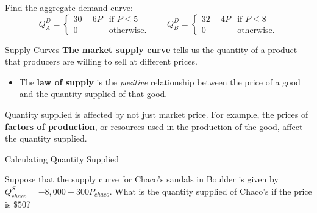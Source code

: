 \documentclass[12pt,t]{beamer}
\begin{document}
\begin{frame}

  \bigskip
  Find the aggregate demand curve:
  $$
    Q_A^D =
    \begin{cases}
      30 - 6P & \text{if } P \leq 5 \\
      0       & \text{otherwise}.
    \end{cases}
    \quad\quad
    Q_B^D =
    \begin{cases}
      32 - 4P & \text{if } P  \leq 8 \\
      0       & \text{otherwise}.
    \end{cases}
  $$
\end{frame}

\begin{frame}{Supply Curves}
  \textbf{The market supply curve} tells us the quantity of a product that producers are willing to sell at different prices.

  \begin{itemize}
    \item The \textbf{law of supply} is the \emph{positive} relationship between the price of a good and the quantity supplied of that good.
  \end{itemize}

  \pause
  \bigskip
  Quantity supplied is affected by not just market price. For example, the prices of \textbf{factors of production}, or resources used in the production of the good, affect the quantity supplied.
\end{frame}

\begin{frame}{Calculating Quantity Supplied}

\bigskip
Suppose that the supply curve for Chaco's sandals in Boulder is given by $Q^S_{chaco} = -8,000 + 300P_{chaco}$. What is the quantity supplied of Chaco's if the price is $ \$ 50 $?

\end{frame}
\end{document}
